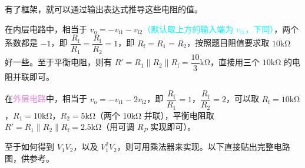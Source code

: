 \documentclass[UTF8]{ctexart}
\newcommand\xb[1]{_\mathrm{#1}}
\begin{document}
\newpage
{}
\BgThispage

有了框架，就可以通过输出表达式推导这些电阻的值。

在\colorbox{green!10}{\textcolor{green!50!black}{内层电路}}中，相当于 $v\xb{o} = -v\xb{i1}-v\xb{i2}$\textcolor{cyan}{（默认取上方的输入端为 $v\xb{i1}$，下同）}，两个系数都是 $-1$，即 $\dfrac{R\xb{f}}{R_1}=\dfrac{R\xb{f}}{R_2}=1$，即 $R\xb{f}=R_1=R_2$，按照题目阻值要求取 $\mathrm{10k\Omega}$ 好一些。至于平衡电阻，则有 $R'=R_1\parallel R_2\parallel R\xb{f} = \dfrac{10}{3}\mathrm{k\Omega}$，直接用三个 $\mathrm{10k\Omega}$ 的电阻并联即可。

在\colorbox{violet!10}{\textcolor{violet}{外层电路}}中，相当于 $v\xb{o} = -v\xb{i1} -2v\xb{i2}$，即 $\dfrac{R\xb{f}}{R_1}=1$，$\dfrac{R\xb{f}}{R_2}=2$，可以取 $R\xb{f}=10\mathrm{k\Omega}$，$R_1=10\mathrm{k\Omega}$，$R_2=5\mathrm{k\Omega}$（两个 $10\mathrm{k\Omega}$ 并联），平衡电阻取 $R'=R_1\parallel R_2\parallel R\xb{f} = 2.5\mathrm{k\Omega}$（用可调 $R_P$ 实现即可）。

至于如何得到 $V_1V_2$，以及 $V_1^2V_2$，则可用乘法器来实现。以下直接贴出完整电路图，供参考。
\end{document}
